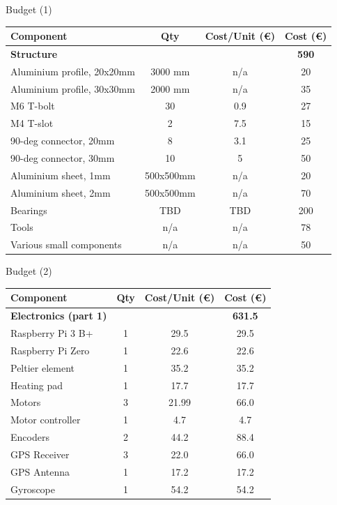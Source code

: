 \documentclass[11pt, aspectratio=169]{beamer}
\begin{document}
\begin{frame}{Budget (1)}
    \centering
    \begin{tabular}{|l|c|c|c|} 
        \hline
        Component & Qty & Cost/Unit (\euro) & Cost (\euro)  \\ 
        \hline
        \rowcolor{Gray}
        \textbf{Structure} &  &  & \textbf{590}  \\
        Aluminium profile, 20x20mm & 3000 mm & n/a & 20  \\
        Aluminium profile, 30x30mm & 2000 mm & n/a & 35  \\
        M6 T-bolt & 30 & 0.9 & 27  \\
        M4 T-slot & 2 & 7.5 & 15  \\
        90-deg connector, 20mm & 8 & 3.1 & 25 \\
        90-deg connector, 30mm & 10 & 5 & 50 \\
        Aluminium sheet, 1mm & 500x500mm & n/a & 20 \\
        Aluminium sheet, 2mm & 500x500mm & n/a & 70 \\
        Bearings & TBD & TBD & 200 \\
        Tools & n/a & n/a & 78 \\
        Various small components & n/a & n/a & 50  \\
        \hline
    \end{tabular}
\end{frame}
\begin{frame}{Budget (2)}
    \centering
    \begin{tabular}{|l|c|c|c|} 
        \hline
        Component & Qty & Cost/Unit (\euro) & Cost (\euro)  \\ 
        \hline
        \rowcolor{Gray}
        \textbf{Electronics (part 1)} &  &  & \textbf{631.5}  \\ 
        Raspberry Pi 3 B+ & 1 & 29.5 & 29.5  \\
        Raspberry Pi Zero & 1 & 22.6 & 22.6  \\
        Peltier element & 1 & 35.2 & 35.2  \\
        Heating pad & 1 & 17.7 & 17.7  \\ 
        Motors & 3 & 21.99 & 66.0  \\ 
        Motor controller & 1 & 4.7 & 4.7  \\
        Encoders & 2 & 44.2 & 88.4  \\
        GPS Receiver & 3 & 22.0 & 66.0  \\ 
        GPS Antenna & 1 & 17.2 & 17.2  \\
        Gyroscope & 1 & 54.2 & 54.2  \\
        \hline
    \end{tabular}
\end{frame}
\end{document}
